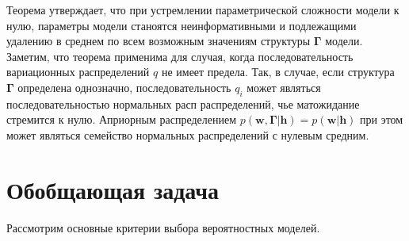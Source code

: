 Теорема утверждает, что при устремлении параметрической сложности модели к нулю, параметры модели станоятся неинформативными и подлежащими удалению в среднем по всем возможным значениям  структуры  $\boldsymbol{\Gamma}$ модели. Заметим, что теорема применима для случая, когда последовательность вариационных распределений $q$ не имеет предела. Так, в случае, если структура $\boldsymbol{\Gamma}$ определена однозначно, последовательность $q_i$ может являться последовательностью нормальных расп распределений, чье матожидание стремится к нулю. Априорным распределением $p(\mathbf{w},\boldsymbol{\Gamma}|\mathbf{h}) = p(\mathbf{w}|\mathbf{h})$ при этом может являться семейство нормальных распределений с нулевым средним.

\section{Обобщающая задача}
Рассмотрим основные критерии выбора вероятностных моделей.

